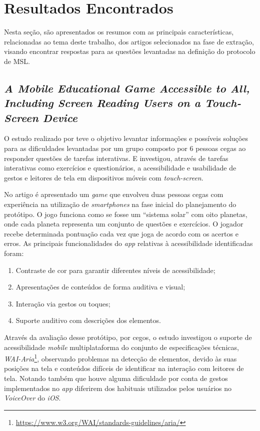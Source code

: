 \newpage{}

\section{Resultados Encontrados}

Nesta seção, são apresentados os resumos com as principais características, relacionadas ao tema deste trabalho, dos artigos selecionados na fase de extração, visando encontrar respostas para as questões levantadas na definição do protocolo de MSL\@.

\subsection{\emph{A Mobile Educational Game Accessible to All, Including Screen Reading Users on a Touch-Screen Device}}

O estudo realizado por  teve o objetivo levantar informações e possíveis soluções para as dificuldades levantadas por um grupo composto por 6 pessoas cegas ao responder questões de tarefas interativas.
E investigou, através de tarefas interativas como exercícios e questionários, a acessibilidade e usabilidade de gestos e leitores de tela em dispositivos móveis com \emph{touch-screen}.

No artigo é apresentado um \emph{game} que envolveu duas pessoas cegas com experiência na utilização de \emph{smartphones} na fase inicial do planejamento do protótipo.
O jogo funciona como se fosse um ``sistema solar'' com oito planetas, onde cada planeta representa um conjunto de questões e exercícios.
O jogador recebe determinada pontuação cada vez que joga de acordo com os acertos e erros.
As principais funcionalidades do \emph{app} relativas à acessibilidade identificadas foram:

\begin{enumerate}
    \item Contraste de cor para garantir diferentes níveis de acessibilidade;
    \item Apresentações de conteúdos de forma auditiva e visual;
    \item Interação via gestos ou toques;
    \item Suporte auditivo com descrições dos elementos.
\end{enumerate}

Através da avaliação desse protótipo, por cegos, o estudo investigou o suporte de acessibilidade \emph{mobile} multiplataforma do conjunto de especificações técnicas, \emph{WAI-Aria}\footnote{\url{https://www.w3.org/WAI/standards-guidelines/aria/}}, observando problemas na detecção de elementos, devido às suas posições na tela e conteúdos difíceis de identificar na interação com leitores de tela.
Notando também que houve alguma dificuldade por conta de gestos implementados no \emph{app} diferirem dos habituais utilizados pelos usuários no \emph{VoiceOver} do \emph{iOS}.

